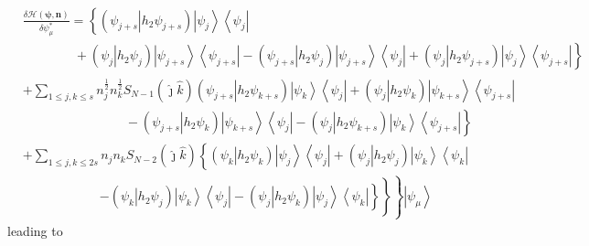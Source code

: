 \documentclass[aps,preprint]{revtex4}%
\begin{document}
\begin{align}
&  \frac{\delta\mathcal{H}\left(  \mathbf{\psi,n}\right)  }{\delta\psi_{\mu
}^{\ast}}=\left\{  \left(  \left.  \psi_{j+s}\right\vert h_{2}\psi
_{j+s}\right)  \left\vert \psi_{j}\right\rangle \left\langle \psi
_{j}\right\vert \right.  \nonumber\\
&  \qquad\qquad+\left(  \left.  \psi_{j}\right\vert h_{2}\psi_{j}\right)
\left\vert \psi_{j+s}\right\rangle \left\langle \psi_{j+s}\right\vert -\left.
\left(  \left.  \psi_{j+s}\right\vert h_{2}\psi_{j}\right)  \left\vert
\psi_{j+s}\right\rangle \left\langle \psi_{j}\right\vert +\left(  \left.
\psi_{j}\right\vert h_{2}\psi_{j+s}\right)  \left\vert \psi_{j}\right\rangle
\left\langle \psi_{j+s}\right\vert \right\}  \nonumber\\
&  +\sum_{1\leq j,k\leq s}n_{j}^{\frac{1}{2}}n_{k}^{\frac{1}{2}}S_{N-1}\left(
\hat{\jmath}\hat{k}\right)  \overset{}{\left(  \left.  \psi_{j+s}\right\vert
h_{2}\psi_{k+s}\right)  \left\vert \psi_{k}\right\rangle \left\langle \psi
_{j}\right\vert +\left(  \left.  \psi_{j}\right\vert h_{2}\psi_{k}\right)
\left\vert \psi_{k+s}\right\rangle \left\langle \psi_{j+s}\right\vert
}\nonumber\\
&  \qquad\qquad\qquad\qquad-\left.  \left(  \left.  \psi_{j+s}\right\vert
h_{2}\psi_{k}\right)  \left\vert \psi_{k+s}\right\rangle \left\langle \psi
_{j}\right\vert -\left(  \left.  \psi_{j}\right\vert h_{2}\psi_{k+s}\right)
\left\vert \psi_{k}\right\rangle \left\langle \psi_{j+s}\right\vert \right\}
\nonumber\\
&  +\sum_{1\leq j,k\leq2s}n_{j}n_{k}S_{N-2}\left(  \hat{\jmath}\hat{k}\right)
\left\{  \left(  \left.  \psi_{k}\right\vert h_{2}\psi_{k}\right)  \left\vert
\psi_{j}\right\rangle \left\langle \psi_{j}\right\vert +\left(  \left.
\psi_{j}\right\vert h_{2}\psi_{j}\right)  \left\vert \psi_{k}\right\rangle
\left\langle \psi_{k}\right\vert \right.  \nonumber\\
&  \qquad\qquad\qquad\left.  \overset{}{\left.  -\overset{}{\left.  \left(
\left.  \psi_{k}\right\vert h_{2}\psi_{j}\right)  \left\vert \psi
_{k}\right\rangle \left\langle \psi_{j}\right\vert -\left(  \left.  \psi
_{j}\right\vert h_{2}\psi_{k}\right)  \left\vert \psi_{j}\right\rangle
\left\langle \psi_{k}\right\vert \right\}  }\right\}  }\right\}  \left\vert
\psi_{\mu}\right\rangle
\end{align}
leading to%
\end{document}

